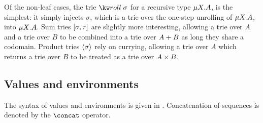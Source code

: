Of the non-leaf cases, the trie $\trieRoll{\sigma}$ for a recursive type
$\mu{X}.{A}$, is the simplest: it simply injects $\sigma$, which is a
trie over the one-step unrolling of $\mu{X}.{A}$, into
$\mu{X}.{A}$. Sum tries $[\sigma,\tau]$ are slightly more
interesting, allowing a trie over $A$ and a trie over $B$ to be combined into a
trie over ${A}+{B}$ as long they share a codomain. Product tries
${\langle\sigma\rangle}$ rely on currying, allowing a trie over $A$ which returns a
trie over $B$ to be treated as a trie over ${A}\times{B}$.

\subsection{Values and environments}




The syntax of values and environments is given in
. Concatenation of sequences is denoted by
the $\concat$ operator.
